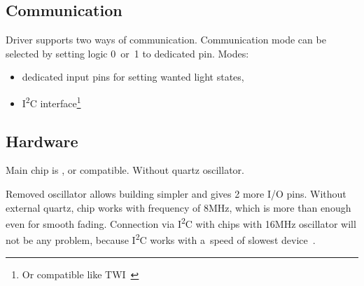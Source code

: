 
\subsection{Communication}
Driver supports two ways of communication. Communication mode can be selected by setting logic 0~or~1 to dedicated pin.
\newline
Modes:
\begin{itemize}
	\item dedicated input pins for setting wanted light states,
	\item I\textsuperscript{2}C interface\footnote{Or compatible like TWI~\cite{i2c-twi}}
\end{itemize}


\subsection{Hardware}
Main chip is , or compatible. Without quartz oscillator.

Removed oscillator allows building simpler and gives 2 more I/O pins. Without external quartz, chip works with frequency of 8MHz, which is more than enough
even for smooth fading. Connection via I\textsuperscript{2}C with chips with 16MHz oscillator will not be any problem, because I\textsuperscript{2}C works
with a~speed of slowest device~\cite{i2cspeed}.
